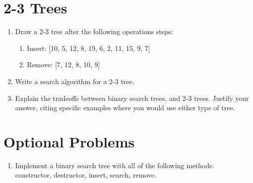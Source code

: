 \documentclass[11pt]{article}
\begin{document}
\section{2-3 Trees}
\begin{enumerate}
    \item Draw a 2-3 tree after the following operations steps:
    \begin{enumerate}
        \item Insert: [10, 5, 12, 8, 19, 6, 2, 11, 15, 9, 7]
        \item Remove: [7, 12, 8, 10, 9]
    \end{enumerate}

    \item Write a search algorithm for a 2-3 tree.

    \item Explain the tradeoffs between binary search trees, and 2-3 trees. Justify your answer, citing specific examples where you would use either type of tree.
\end{enumerate}

\section{Optional Problems}
\begin{enumerate}
    \item Implement a binary search tree with all of the following methods: constructor, destructor, insert, search, remove.
\end{enumerate}


\label{r:lastpage}
\end{document}
